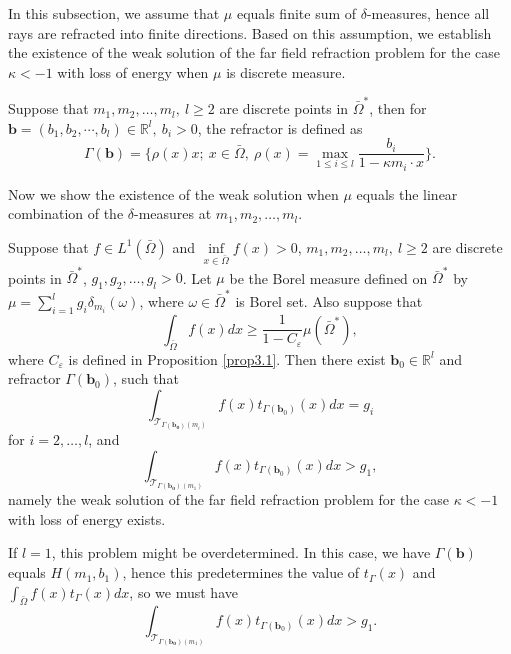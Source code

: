 \documentclass[a4paper,12pt,]{article}
\newtheorem{theorem}{\hskip\parindent\bf Theorem}[section]%
\newtheorem{remark}{\hskip\parindent\bf Remark}[section]%
\numberwithin{equation}{section}
\numberwithin{equation}{section} \allowdisplaybreaks
\begin{document}
In this subsection, we assume that $\mu$ equals finite sum of $\delta$-measures, hence all rays are refracted into finite directions. Based on this assumption, we establish the existence of the weak solution of the far field refraction problem for the case $\kappa <-1$ with loss of energy when $\mu$ is discrete measure.

\begin{remark}
  Suppose that $m_{1},m_{2},\ldots, m_{l},~l \geq 2$ are discrete points in $\bar{\Omega}^{\ast}$, then for $\mathbf{b} = (b_{1},b_{2},\cdots ,b_{l}) \in \mathbb{R}^{l},~b_{i}>0$, the refractor is defined as
  \begin{equation}\label{3.10}
    \Gamma(\mathbf{b}) = \{\rho(x)x;~x\in \bar{\Omega},~\rho(x)=\max_{1\leq i \leq l}\frac{b_{i}}{1 - \kappa m_{i}\cdot x}\}.
  \end{equation}
  \label{rem3.5}
\end{remark}

Now we show the existence of the weak solution when $\mu$ equals the linear combination of the $\delta$-measures at $m_{1},m_{2},\ldots, m_{l}$. 

\begin{theorem}
  Suppose that $f \in L^{1}(\bar{\Omega})$ and $\inf\limits_{x \in \bar{\Omega}}f(x)>0$, $m_{1},m_{2},\ldots, m_{l},~l \geq 2$ are discrete points in $\bar{\Omega}^{\ast}$, $g_{1}, g_{2}, \ldots, g_{l}>0$. Let $\mu$ be the Borel measure defined on $\bar{\Omega}^{\ast}$ by $\mu = \sum\limits_{i = 1}^{l}g_{i}\delta_{m_{i}}(\omega)$, where $\omega \in \bar{\Omega}^{\ast}$ is Borel set. Also suppose that $$\displaystyle\int_{\bar{\Omega}}f(x)dx \geq \dfrac{1}{1 - C_{\varepsilon}} \mu(\bar{\Omega}^{\ast}),$$ where $C_{\varepsilon}$ is defined in Proposition \ref{prop3.1}. Then there exist $\mathbf{b}_{0} \in \mathbb{R}^{l}$ and refractor $\Gamma(\mathbf{b}_{0})$, such that
  $$\int_{\mathcal{T}_{\Gamma{(\mathbf{b_{0}})}(m_{i})}}f(x)t_{\Gamma(\mathbf{b}_{0})}(x)dx = g_{i}$$
  for $i = 2,\ldots,l$, and
  $$\int_{\mathcal{T}_{\Gamma{(\mathbf{b_{0}})}(m_{1})}}f(x)t_{\Gamma(\mathbf{b}_{0})}(x)dx > g_{1},$$
  namely the weak solution of the far field refraction problem for the case $\kappa <-1$ with loss of energy exists.
  \label{thm3.3}
\end{theorem}

\begin{remark}
    If $l = 1$, this problem might be overdetermined. In this case, we have $\Gamma(\mathbf{b})$ equals $H(m_{1},b_{1})$, hence this predetermines the value of $t_{\Gamma}(x)$ and $\displaystyle\int_{\bar{\Omega}}f(x)t_{\Gamma}(x)dx$, so we must have
    $$\int_{\mathcal{T}_{\Gamma{(\mathbf{b_{0}})}(m_{1})}}f(x)t_{\Gamma(\mathbf{b}_{0})}(x)dx > g_{1}.$$
    \label{rem3.6}
\end{remark}
\end{document}
